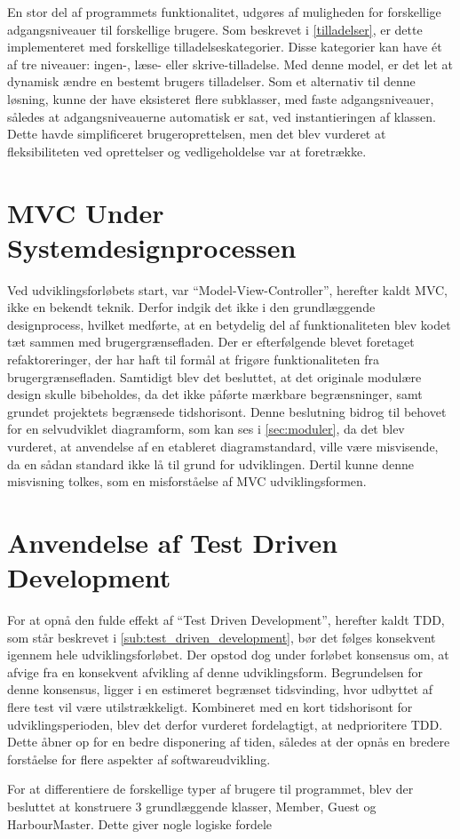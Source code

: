 En stor del af programmets funktionalitet, udgøres af muligheden for forskellige adgangsniveauer til forskellige brugere. Som beskrevet i \cref{tilladelser}, er dette implementeret med forskellige tilladelseskategorier. Disse kategorier kan have ét af tre niveauer: ingen-, læse- eller skrive-tilladelse. Med denne model, er det let at dynamisk ændre en bestemt brugers tilladelser. Som et alternativ til denne løsning, kunne der have eksisteret flere subklasser, med faste adgangsniveauer, således at adgangsniveauerne automatisk er sat, ved instantieringen af klassen. Dette havde simplificeret brugeroprettelsen, men det blev vurderet at fleksibiliteten ved oprettelser og vedligeholdelse var at foretrække.

\section{MVC Under Systemdesignprocessen}

Ved udviklingsforløbets start, var \enquote{Model-View-Controller}, herefter kaldt MVC, ikke en bekendt teknik. Derfor indgik det ikke i den grundlæggende designprocess, hvilket medførte, at en betydelig del af funktionaliteten blev kodet tæt sammen med brugergrænsefladen. Der er efterfølgende blevet foretaget refaktoreringer, der har haft til formål at frigøre funktionaliteten fra brugergrænsefladen. Samtidigt blev det besluttet, at det originale modulære design skulle bibeholdes, da det ikke påførte mærkbare begrænsninger, samt grundet projektets begrænsede tidshorisont. Denne beslutning bidrog til behovet for en selvudviklet diagramform, som kan ses i \cref{sec:moduler}, da det blev vurderet, at anvendelse af en etableret diagramstandard, ville være misvisende, da en sådan standard ikke lå til grund for udviklingen. Dertil kunne denne misvisning tolkes, som en misforståelse af MVC udviklingsformen.

\section{Anvendelse af Test Driven Development}

For at opnå den fulde effekt af \enquote{Test Driven Development}, herefter kaldt TDD, som står beskrevet i \cref{sub:test_driven_development}, bør det følges konsekvent igennem hele udviklingsforløbet. Der opstod dog under forløbet konsensus om, at afvige fra en konsekvent afvikling af denne udviklingsform. Begrundelsen for denne konsensus, ligger i en estimeret begrænset tidsvinding, hvor udbyttet af flere test vil være utilstrækkeligt. Kombineret med en kort tidshorisont for udviklingsperioden, blev det derfor vurderet fordelagtigt, at nedprioritere TDD. Dette åbner op for en bedre disponering af tiden, således at der opnås en bredere forståelse for flere aspekter af softwareudvikling.


For at differentiere de forskellige typer af brugere til programmet, blev der besluttet at konstruere 3 grundlæggende klasser, Member, Guest og HarbourMaster. Dette giver nogle logiske fordele
